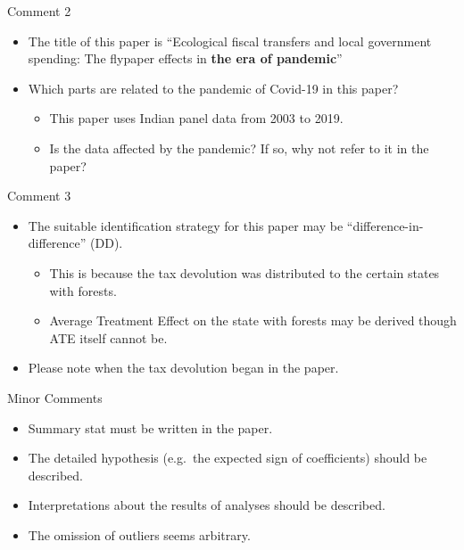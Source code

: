 \documentclass[
  ignorenonframetext,
]{beamer}
\providecommand{\tightlist}{%
  \setlength{\itemsep}{0pt}\setlength{\parskip}{0pt}}
\begin{document}
\begin{frame}{Comment 2}
\protect\hypertarget{comment-2}{}

\begin{itemize}
\tightlist
\item
  The title of this paper is ``Ecological fiscal transfers and local
  government spending: The flypaper effects in
  \textbf{the era of pandemic}''
\item
  Which parts are related to the pandemic of Covid-19 in this paper?

  \begin{itemize}
  \tightlist
  \item
    This paper uses Indian panel data from 2003 to 2019.
  \item
    Is the data affected by the pandemic? If so, why not refer to it in
    the paper?
  \end{itemize}
\end{itemize}

\end{frame}

\begin{frame}{Comment 3}
\protect\hypertarget{comment-3}{}

\begin{itemize}
\tightlist
\item
  The suitable identification strategy for this paper may be
  ``difference-in-difference'' (DD).

  \begin{itemize}
  \tightlist
  \item
    This is because the tax devolution was distributed to the certain
    states with forests.
  \item
    Average Treatment Effect on the state with forests may be derived
    though ATE itself cannot be.
  \end{itemize}
\item
  Please note when the tax devolution began in the paper.
\end{itemize}

\end{frame}

\begin{frame}{Minor Comments}
\protect\hypertarget{minor-comments}{}

\begin{itemize}
\tightlist
\item
  Summary stat must be written in the paper.
\item
  The detailed hypothesis (e.g.~the expected sign of coefficients)
  should be described.
\item
  Interpretations about the results of analyses should be described.
\item
  The omission of outliers seems arbitrary.
\end{itemize}

\end{frame}
\end{document}
